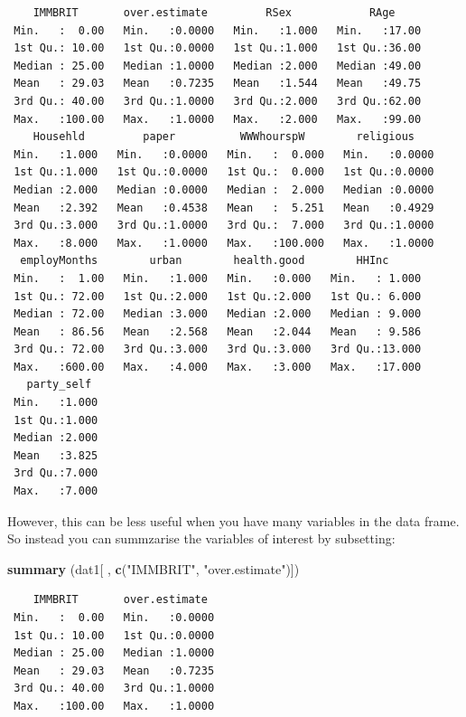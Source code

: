 \documentclass[]{article}
\newenvironment{Shaded}{\begin{snugshade}}{\end{snugshade}}
\newcommand{\KeywordTok}[1]{\textcolor[rgb]{0.13,0.29,0.53}{\textbf{#1}}}
\newcommand{\NormalTok}[1]{#1}
\newcommand{\StringTok}[1]{\textcolor[rgb]{0.31,0.60,0.02}{#1}}
\begin{document}
\begin{verbatim}
    IMMBRIT       over.estimate         RSex            RAge      
 Min.   :  0.00   Min.   :0.0000   Min.   :1.000   Min.   :17.00  
 1st Qu.: 10.00   1st Qu.:0.0000   1st Qu.:1.000   1st Qu.:36.00  
 Median : 25.00   Median :1.0000   Median :2.000   Median :49.00  
 Mean   : 29.03   Mean   :0.7235   Mean   :1.544   Mean   :49.75  
 3rd Qu.: 40.00   3rd Qu.:1.0000   3rd Qu.:2.000   3rd Qu.:62.00  
 Max.   :100.00   Max.   :1.0000   Max.   :2.000   Max.   :99.00  
    Househld         paper          WWWhourspW        religious     
 Min.   :1.000   Min.   :0.0000   Min.   :  0.000   Min.   :0.0000  
 1st Qu.:1.000   1st Qu.:0.0000   1st Qu.:  0.000   1st Qu.:0.0000  
 Median :2.000   Median :0.0000   Median :  2.000   Median :0.0000  
 Mean   :2.392   Mean   :0.4538   Mean   :  5.251   Mean   :0.4929  
 3rd Qu.:3.000   3rd Qu.:1.0000   3rd Qu.:  7.000   3rd Qu.:1.0000  
 Max.   :8.000   Max.   :1.0000   Max.   :100.000   Max.   :1.0000  
  employMonths        urban        health.good        HHInc       
 Min.   :  1.00   Min.   :1.000   Min.   :0.000   Min.   : 1.000  
 1st Qu.: 72.00   1st Qu.:2.000   1st Qu.:2.000   1st Qu.: 6.000  
 Median : 72.00   Median :3.000   Median :2.000   Median : 9.000  
 Mean   : 86.56   Mean   :2.568   Mean   :2.044   Mean   : 9.586  
 3rd Qu.: 72.00   3rd Qu.:3.000   3rd Qu.:3.000   3rd Qu.:13.000  
 Max.   :600.00   Max.   :4.000   Max.   :3.000   Max.   :17.000  
   party_self   
 Min.   :1.000  
 1st Qu.:1.000  
 Median :2.000  
 Mean   :3.825  
 3rd Qu.:7.000  
 Max.   :7.000  
\end{verbatim}

However, this can be less useful when you have many variables in the data frame. So instead you can summzarise the variables of interest by subsetting:

\begin{Shaded}
\begin{Highlighting}[]
\KeywordTok{summary}\NormalTok{ (dat1[ , }\KeywordTok{c}\NormalTok{(}\StringTok{"IMMBRIT"}\NormalTok{, }\StringTok{"over.estimate"}\NormalTok{)])}
\end{Highlighting}
\end{Shaded}

\begin{verbatim}
    IMMBRIT       over.estimate   
 Min.   :  0.00   Min.   :0.0000  
 1st Qu.: 10.00   1st Qu.:0.0000  
 Median : 25.00   Median :1.0000  
 Mean   : 29.03   Mean   :0.7235  
 3rd Qu.: 40.00   3rd Qu.:1.0000  
 Max.   :100.00   Max.   :1.0000  
\end{verbatim}
\end{document}
